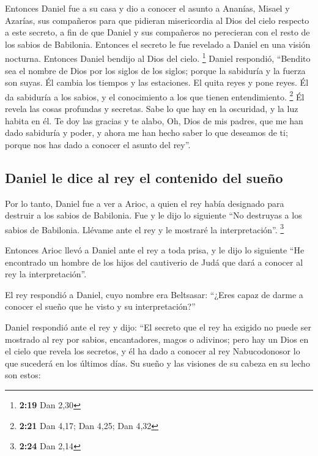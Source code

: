  Entonces Daniel fue a su casa y dio a conocer el asunto
a Ananías, Misael y Azarías, sus compañeros  para que
pidieran misericordia al Dios del cielo respecto a este secreto, a fin
de que Daniel y sus compañeros no perecieran con el resto de los sabios
de Babilonia.  Entonces el secreto le fue revelado a
Daniel en una visión nocturna. Entonces Daniel bendijo al Dios del
cielo. \footnote{\textbf{2:19} Dan 2,30}  Daniel
respondió, ``Bendito sea el nombre de Dios por los siglos de los siglos;
porque la sabiduría y la fuerza son suyas.  Él cambia los
tiempos y las estaciones. El quita reyes y pone reyes. Él da sabiduría a
los sabios, y el conocimiento a los que tienen entendimiento.
\footnote{\textbf{2:21} Dan 4,17; Dan 4,25; Dan 4,32}  Él
revela las cosas profundas y secretas. Sabe lo que hay en la oscuridad,
y la luz habita en él.  Te doy las gracias y te alabo,
Oh, Dios de mis padres, que me han dado sabiduría y poder, y ahora me
han hecho saber lo que deseamos de ti; porque nos has dado a conocer el
asunto del rey''.

\hypertarget{daniel-le-dice-al-rey-el-contenido-del-sueuxf1o}{%
\subsection{Daniel le dice al rey el contenido del
sueño}\label{daniel-le-dice-al-rey-el-contenido-del-sueuxf1o}}

 Por lo tanto, Daniel fue a ver a Arioc, a quien el rey
había designado para destruir a los sabios de Babilonia. Fue y le dijo
lo siguiente ``No destruyas a los sabios de Babilonia. Llévame ante el
rey y le mostraré la interpretación''. \footnote{\textbf{2:24} Dan 2,14}

 Entonces Arioc llevó a Daniel ante el rey a toda prisa,
y le dijo lo siguiente ``He encontrado un hombre de los hijos del
cautiverio de Judá que dará a conocer al rey la interpretación''.

 El rey respondió a Daniel, cuyo nombre era Beltsasar:
``¿Eres capaz de darme a conocer el sueño que he visto y su
interpretación?''

 Daniel respondió ante el rey y dijo: ``El secreto que el
rey ha exigido no puede ser mostrado al rey por sabios, encantadores,
magos o adivinos;  pero hay un Dios en el cielo que
revela los secretos, y él ha dado a conocer al rey Nabucodonosor lo que
sucederá en los últimos días. Su sueño y las visiones de su cabeza en su
lecho son estos:

